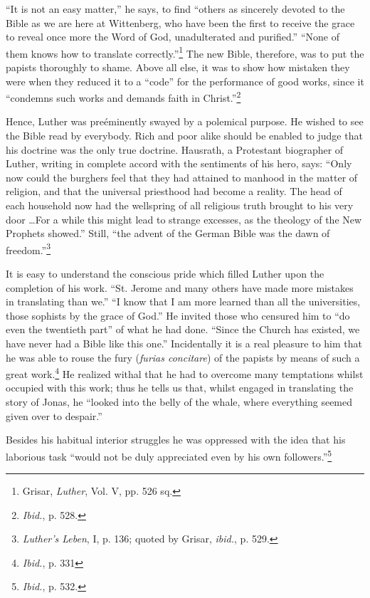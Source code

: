 “It is not an easy matter,” he says, to find “others as sincerely devoted
to the Bible as we are here at Wittenberg, who have been the first to receive
the grace to reveal once more the Word of God, unadulterated and purified.”
“None of them knows how to translate correctly.”\footnote{Grisar, \textit{Luther}, Vol. V, pp. 526 sq.}
 The new Bible, therefore,
was to put the papists thoroughly to shame. Above all else, it was to
show how mistaken they were when they reduced it to a “code” for the
performance of good works, since it “condemns such works and demands
faith in Christ.”\footnote{\textit{Ibid.}, p. 528.}

Hence, Luther was preéminently swayed by a polemical purpose. He
wished to see the Bible read by everybody. Rich and poor alike should be
enabled to judge that his doctrine was the only true doctrine. Hausrath,
a Protestant biographer of Luther, writing in complete accord with the
sentiments of his hero, says: “Only now could the burghers feel that they
had attained to manhood in the matter of religion, and that the universal
priesthood had become a reality. The head of each household now had the
wellspring of all religious truth brought to his very door \dots For a while
this might lead to strange excesses, as the theology of the New Prophets
showed.” Still, “the advent of the German Bible was the dawn of freedom.”\footnote{\textit{Luther’s Leben}, I, p. 136; quoted by Grisar, \textit{ibid.}, p. 529.}

It is easy to understand the conscious pride which filled Luther upon the
completion of his work. “St. Jerome and many others have made more mistakes
in translating than we.” “I know that I am more learned than all the
universities, those sophists by the grace of God.” He invited those who
censured him to “do even the twentieth part” of what he had done. “Since
the Church has existed, we have never had a Bible like this one.”
Incidentally it is a real pleasure to him that he was able to rouse the fury
(\textit{furias concitare}) of the papists by means of such a great work.\footnote{\textit{Ibid.}, p. 331}
He realized withal that he had to overcome many temptations whilst occupied
with this work; thus he tells us that, whilst engaged in translating
the story of Jonas, he “looked into the belly of the whale, where everything
seemed given over to despair.”

Besides his habitual interior struggles he was oppressed with the idea that
his laborious task “would not be duly appreciated even by his own followers.”\footnote{\textit{Ibid.}, p. 532.}

